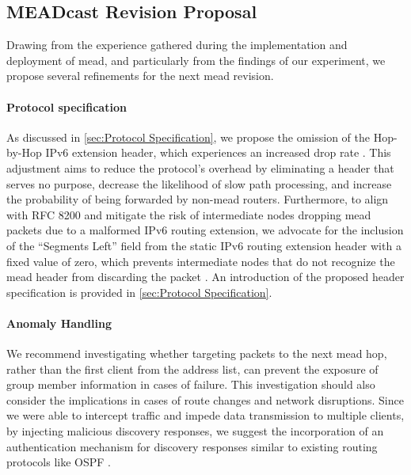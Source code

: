 \subsection{MEADcast Revision Proposal} %
\label{sub:MEADcast Revision Proposal}
Drawing from the experience gathered during the implementation and deployment
    of \gls{mead}, and particularly from the findings of our experiment, we
    propose several refinements for the next \gls{mead} revision.

\paragraph{Protocol specification}
As discussed in \autoref{sec:Protocol Specification}, we propose the omission
    of the Hop-by-Hop IPv6 extension header, which experiences an increased
    drop rate \cite{rfc7872_ext_hdrs_drop_rate}.
This adjustment aims to reduce the protocol's overhead by eliminating a header
    that serves no purpose, decrease the likelihood of slow path processing,
    and increase the probability of being forwarded by non-\gls{mead} routers.
Furthermore, to align with RFC 8200 \cite{rfc8200_ipv6_hdr} and mitigate the
    risk of intermediate nodes dropping \gls{mead} packets due to a malformed
    IPv6 routing extension, we advocate for the inclusion of the ``Segments
    Left'' field from the static IPv6 routing extension header with a fixed
    value of zero, which prevents intermediate nodes that do not recognize
    the \gls{mead} header from discarding the packet \cite{rfc8200_ipv6_hdr}.
An introduction of the proposed header specification is provided in
    \autoref{sec:Protocol Specification}.

\paragraph{Anomaly Handling} %
We recommend investigating whether targeting packets to the next \gls{mead}
    hop, rather than the first client from the address list, can prevent the
    exposure of group member information in cases of failure.
This investigation should also consider the implications in cases of route
    changes and network disruptions.
Since we were able to intercept traffic and impede data transmission to
    multiple clients, by injecting malicious discovery responses, we suggest
    the incorporation of an authentication mechanism for discovery responses
    similar to existing routing protocols like OSPF \cite{rfc2328_ospf}.

